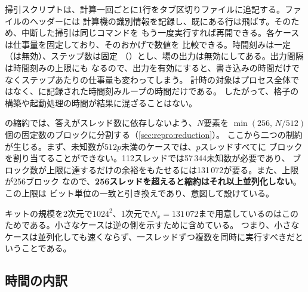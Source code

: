 掃引スクリプトは、計算一回ごとに1行をタブ区切りファイルに追記する。ファイルのヘッダーには
計算機の識別情報を記録し、既にある行は飛ばす。そのため、中断した掃引は同じコマンドを
もう一度実行すれば再開できる。各ケースは仕事量を固定しており、そのおかげで数値を
比較できる。時間刻みは一定（は無効）、ステップ数は固定
（）とし、場の出力は無効にしてある。出力間隔は時間刻みの上限にも
なるので、出力を有効にすると、書き込みの時間だけでなくステップあたりの仕事量も変わってしまう。
計時の対象はプロセス全体ではなく、に記録された時間刻みループの時間だけである。
したがって、格子の構築や起動処理の時間が結果に混ざることはない。

\begin{warn}
  の縮約では、答えがスレッド数に依存しないよう、$N$要素を
  $\min(256,\,N/512)$個の固定数のブロックに分割する（\cref{sec:repro:reduction}）。
  ここから二つの制約が生じる。まず、未知数が$512p$未満のケースでは、$p$スレッドすべてに
  ブロックを割り当てることができない。112スレッドでは57\,344未知数が必要であり、
  ブロック数が上限に達するだけの余裕をもたせるには131\,072が要る。また、上限が256ブロック
  なので、\textbf{256スレッドを超えると縮約はそれ以上並列化しない}。この上限は
  ビット単位の一致と引き換えであり、意図して設けている。

  キットの規模を2次元で$1024^{2}$、1次元で$N_x =
  131\,072$まで用意しているのはこのためである。小さなケースは逆の側を示すために含めている。
  つまり、小さなケースは並列化しても速くならず、一スレッドずつ複数を同時に実行すべきだということである。
\end{warn}

\subsection{時間の内訳}
\label{sec:parallel:profile}

